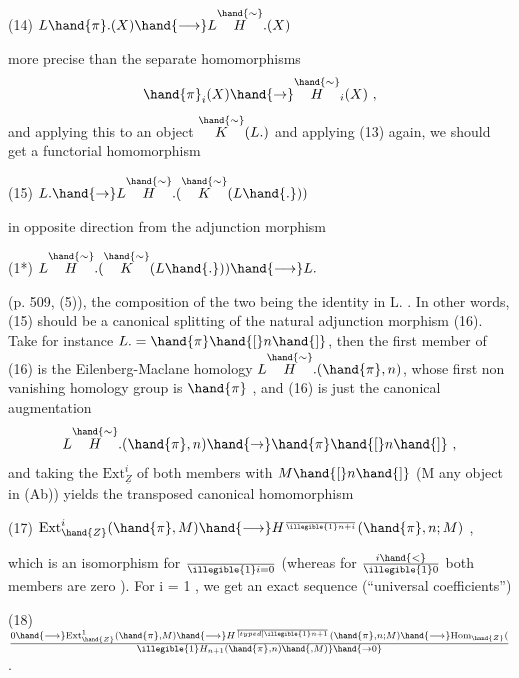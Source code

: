 
(14) \qquad $L\hand{\pi}.(X) \hand{\longrightarrow} L\overset{\hand{\sim}}{H}.(X)$

more precise than the separate homomorphisms
\[ \hand{\pi}_i(X) \hand{\to} \overset{\hand{\sim}}{H}_i(X) \ , \]
and applying this to an object $\overset{\hand{\sim}}{K}(L.)$ and applying (13) again, we should
get a functorial homomorphism

(15) \qquad $L. \hand{\to} L\overset{\hand{\sim}}{H}.(\overset{\hand{\sim}}{K}(L\hand{.}))$

in opposite direction from the adjunction morphism

(1*) \qquad $L\overset{\hand{\sim}}{H}.(\overset{\hand{\sim}}{K}(L\hand{.})) \hand{\longrightarrow} L.$

(p. 509, (5)), the composition of the two being the identity in L. .
In other words, (15) should be a canonical splitting of the natural
adjunction morphism (16). Take for instance $L. =\hand{\pi}\hand{[}n\hand{]}$, then the first
member of (16) is the Eilenberg-Maclane homology $L\overset{\hand{\sim}}{H}.(\hand{\pi},n)$, whose first
non vanishing homology group is $\hand{\pi}$ , and (16) is just the canonical
augmentation
\[ L\overset{\hand{\sim}}{H}.(\hand{\pi},n)\hand{\to}\hand{\pi}\hand{[}n\hand{]} \ , \]
and taking the $\mathrm{Ext}^i_{\underline{Z}}$ of both members with $M\hand{[}n\hand{]}$ (M any object in (Ab))
yields the transposed canonical homomorphism

(17) \qquad $\mathrm{Ext}^i_{\hand{Z}}(\hand{\pi},M) \hand{\longrightarrow} H^{\over{\illegible{1}}{n+i}}(\hand{\pi},n; M)$ \quad ,

which is an isomorphism for $\over{\illegible{1}}{i=0}$ (whereas for $i\hand{<} \over{\illegible{1}}{0}$ both members are
zero ). For i = 1 , we get an exact sequence (``universal coefficients'')

(18) \qquad $0 \hand{\longrightarrow} \mathrm{Ext}^1_{\hand{Z}}(\hand{\pi},M) \hand{\longrightarrow} H^{\over[typed]{\illegible{1}}{n+1}}(\hand{\pi},n;M) \hand{\longrightarrow} \mathrm{Hom}_{\hand{Z}}(\over{\illegible{1}}{H_{n+1}}(\hand{\pi},n)\hand{, M)} \hand{\to 0}$ .

